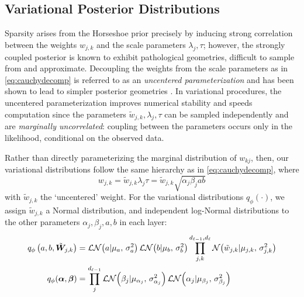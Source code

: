 \subsection{Variational Posterior Distributions}
\label{subsec:ch3-vardist}

Sparsity arises from the Horseshoe prior precisely by inducing strong correlation between the weights $w_{j,k}$ and the scale parameters $\lambda_j, \tau$; however, the strongly coupled posterior is known to exhibit pathological geometries, difficult to sample from and approximate.  Decoupling the weights from the scale parameters as in \ref{eq:cauchydecomp} is referred to as an \emph{uncentered parameterization} and has been shown to lead to simpler posterior geometries \citep{Betancourt_hamiltonian_2015}.  In variational procedures, the uncentered parameterization improves numerical stability and speeds computation since the parameters $\tilde{w}_{j,k}, \lambda_j, \tau$ can be sampled independently and are \textit{marginally uncorrelated}: coupling between the parameters occurs only in the likelihood, conditional on the observed data. 

Rather than directly parameterizing the marginal distribution of $w_{kj}$, then, 
our variational distributions follow the same hierarchy as in \ref{eq:cauchydecomp}, where 
\begin{equation}
  w_{j, k}
        = \tilde{w}_{j, k} \lambda_{j} \tau
        = \tilde{w}_{j, k} \sqrt{\alpha_{j} \beta_{j} a b}
  \label{eq:uncentered}
\end{equation}
with $\tilde{w}_{j, k}$ the `uncentered' weight.  For the variational distributions $q_\phi(\cdot)$, we assign $\tilde{w}_{j, k}$ a Normal distribution, and independent log-Normal distributions to the other parameters $\alpha_j, \beta_j, a, b$ in each layer:
\begin{align}
  q_\phi\left(a, b, \tilde{\bm{W}}_{j,k}\right)
    &= 
        \mathcal{LN}\!\left(a | \mu_{a},\, \sigma_{a}^2\right)
        \mathcal{LN}\!\left(b | \mu_{b},\, \sigma_{b}^2\right)
        \prod_{j,k}^{d_{\ell-1}, d_\ell}\mathcal{N}\!\left(\tilde{w}_{j, k} | \mu_{j,k},\, \sigma_{j,k}^2\right)
    \label{eq: abw-dists}
    \\
  q_\phi(\bm{\alpha}, \bm{\beta})
    &= 
        \prod_{j}^{d_{\ell-1}}
            \mathcal{LN}\!\left(\beta_j | \mu_{\alpha_j},\, \sigma_{\alpha_j}^2\right)
            \mathcal{LN}\!\left(\alpha_j | \mu_{\beta_j},\, \sigma_{\beta_j}^2\right)
    \label{eq:alphabeta-dists}
\end{align}

